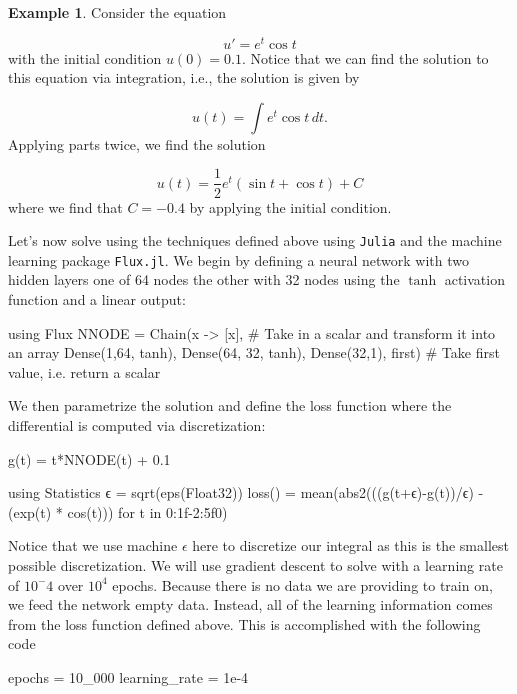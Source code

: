 \documentclass{CUP-JNL-DTM}%
\theoremstyle{definition}
\newtheorem{example}[theorem]{Example}
\numberwithin{equation}{section}
\newcommand{\Julia}{\texttt{Julia} }
\begin{document}
\begin{example}
	
Consider the equation

\begin{equation}
	u' = e^t \cos t
\end{equation}
with the initial condition $u(0) = 0.1$. Notice that we can find the solution to this equation via integration, i.e., the solution is given by

\begin{equation}
	u(t) = \int e^t \cos t \, dt. 
\end{equation}
Applying parts twice, we find the solution

\begin{equation}
	u(t) = \frac{1}{2}e^t(\sin t + \cos t) + C
\end{equation}
where we find that $C = -0.4$ by applying the initial condition. 

Let's now solve using the techniques defined above using \Julia and the machine learning package \texttt{Flux.jl}. We begin by defining a neural network with two hidden layers one of 64 nodes the other with 32 nodes using the $\tanh$ activation function and a linear output: 

\begin{jllisting}
using Flux
NNODE = Chain(x -> [x], # Take in a scalar and transform it into an array
           Dense(1,64, tanh),
           Dense(64, 32, tanh),
           Dense(32,1),
           first) # Take first value, i.e. return a scalar
\end{jllisting}
We then parametrize the solution and define the loss function where the differential is computed via discretization:

\begin{jllisting}
g(t) = t*NNODE(t) + 0.1

using Statistics
ϵ = sqrt(eps(Float32))
loss() = mean(abs2(((g(t+ϵ)-g(t))/ϵ) - (exp(t) * cos(t))) for t in 0:1f-2:5f0)
\end{jllisting}
Notice that we use machine $\epsilon$ here to discretize our integral as this is the smallest possible discretization. We will use gradient descent to solve with a learning rate of $10^-4$ over $10^4$ epochs. Because there is no data we are providing to train on, we feed the network empty data. Instead, all of the learning information comes from the loss function defined above. This is accomplished with the following code

\begin{jllisting}
epochs = 10_000
learning_rate = 1e-4


\end{jllisting}
\end{example}
\end{document}
